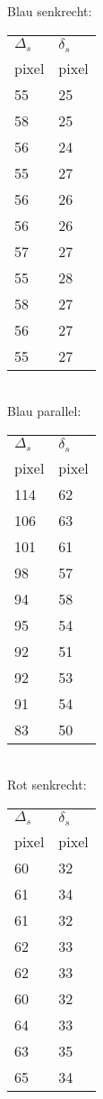 \newpage
Blau senkrecht:\\
\begin{tabular}[h]{l|l}
    $\Delta_s$ & $\delta_s$ \\
    pixel & pixel \\
    \hline
    55 & 25 \\
    58 & 25 \\
    56 & 24 \\
    55 & 27 \\
    56 & 26 \\
    56 & 26 \\
    57 & 27 \\
    55 & 28 \\
    58 & 27 \\
    56 & 27 \\
    55 & 27 \\
\end{tabular}\\
\vspace{2cm}
Blau parallel:\\
\begin{tabular}[h]{l|l}
    $\Delta_s$ & $\delta_s$ \\
    pixel & pixel \\
    \hline
    114 & 62 \\
    106 & 63 \\
    101 & 61 \\
    98 & 57 \\
    94 & 58 \\
    95 & 54 \\
    92 & 51 \\
    92 & 53 \\
    91 & 54 \\
    83 & 50 \\
\end{tabular}\\
\vspace{2cm}
Rot senkrecht:\\
\begin{tabular}[h]{l|l}
    $\Delta_s$ & $\delta_s$ \\
    pixel & pixel \\
    \hline
    60 & 32 \\
    61 & 34 \\
    61 & 32 \\
    62 & 33 \\
    62 & 33 \\
    60 & 32 \\
    64 & 33 \\
    63 & 35 \\
    65 & 34 \\
\end{tabular}